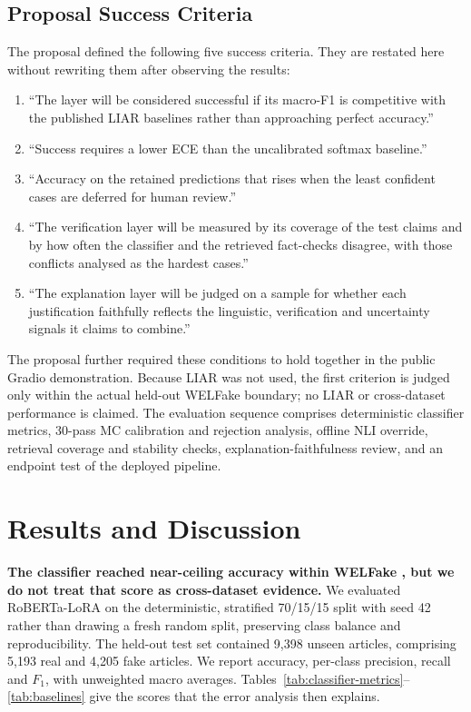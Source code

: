 \documentclass[10pt,twocolumn,letterpaper]{article}
\begin{document}
\subsection{Proposal Success Criteria}
The proposal defined the following five success criteria. They are restated here
without rewriting them after observing the results:
\begin{enumerate}
  \item ``The layer will be considered successful if its macro-F1 is competitive
        with the published LIAR baselines rather than approaching perfect
        accuracy.''
  \item ``Success requires a lower ECE than the uncalibrated softmax baseline.''
  \item ``Accuracy on the retained predictions that rises when the least
        confident cases are deferred for human review.''
  \item ``The verification layer will be measured by its coverage of the test
        claims and by how often the classifier and the retrieved fact-checks
        disagree, with those conflicts analysed as the hardest cases.''
  \item ``The explanation layer will be judged on a sample for whether each
        justification faithfully reflects the linguistic, verification and
        uncertainty signals it claims to combine.''
\end{enumerate}
The proposal further required these conditions to hold together in the public
Gradio demonstration. Because LIAR was not used, the first criterion is judged only
within the actual held-out WELFake boundary; no LIAR or cross-dataset performance
is claimed. The evaluation sequence comprises deterministic classifier metrics,
30-pass MC calibration and rejection analysis, offline NLI override, retrieval
coverage and stability checks, explanation-faithfulness review, and an endpoint
test of the deployed pipeline.
\section{Results and Discussion}

\textbf{The classifier reached near-ceiling accuracy within WELFake
\cite{verma2021welfake}, but we do not treat that score as cross-dataset
evidence.} We evaluated RoBERTa-LoRA on the deterministic, stratified 70/15/15
split with seed 42 rather than drawing a fresh random split, preserving class
balance and reproducibility. The held-out test set contained 9{,}398 unseen
articles, comprising 5{,}193 real and 4{,}205 fake articles. We report accuracy,
per-class precision, recall and $F_1$, with unweighted macro averages.
Tables~\ref{tab:classifier-metrics}--\ref{tab:baselines} give the scores that the
error analysis then explains.
\end{document}
